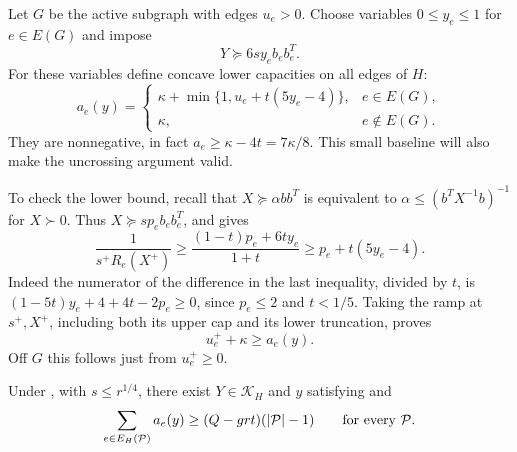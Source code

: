 Let $G$ be the active subgraph with edges $u_e>0$. Choose variables
$0\le y_e\le1$ for $e\in E(G)$ and impose
\begin{equation}
                 Y\succeq6s y_e b_eb_e^T.
 \label{eq:ta-response-LMI}
\end{equation}
For these variables define concave lower capacities on all edges of $H$:
\begin{equation}
 a_e(y)=
 \begin{cases}
 \kappa+\min\{1,u_e+t(5y_e-4)\},&e\in E(G),\\
 \kappa,&e\notin E(G).
 \end{cases}
 \label{eq:ta-lower-capacity}
\end{equation}
They are nonnegative, in fact $a_e\ge\kappa-4t=7\kappa/8$.
This small baseline will also make the uncrossing argument valid.

To check the lower bound, recall that $X\succeq\alpha b b^T$ is
equivalent to $\alpha\le(b^TX^{-1}b)^{-1}$ for $X\succ0$.
Thus $X\succeq sp_e b_eb_e^T$, and  gives
\[
 \frac1{s^+R_e(X^+)}\ge
       \frac{(1-t)p_e+6ty_e}{1+t}
       \ge p_e+t(5y_e-4).
\]
Indeed the numerator of the difference in the last inequality, divided
by $t$, is $(1-5t)y_e+4+4t-2p_e\ge0$, since $p_e\le2$ and $t<1/5$.
Taking the ramp at $s^+,X^+$, including both its upper cap and its lower
truncation, proves
\begin{equation}
                         u_e^++\kappa\ge a_e(y).
 \label{eq:ta-ramp-lower}
\end{equation}
Off $G$ this follows just from $u_e^+\ge0$.

\begin{lemma}
\label{lem:ta-continuation}
Under , with
$s\le r^{1/4}$, there exist $Y\in\mathcal K_H$ and $y$ satisfying
 and
\begin{equation}
 \sum_{e\in E_H(\mathcal P)}a_e(y)
       \ge (Q-grt)(|\mathcal P|-1)
                  \qquad\hbox{for every }\mathcal P.
 \label{eq:ta-strong-target}
\end{equation}
\end{lemma}

